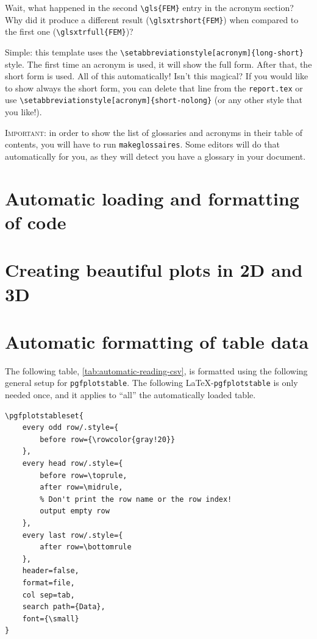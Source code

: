 Wait, what happened in the second \verb|\gls{FEM}| entry in the acronym section? Why did it produce a different result (\verb|\glsxtrshort{FEM}|) when compared to the first one (\verb|\glsxtrfull{FEM}|)?

Simple: this template uses the \verb|\setabbreviationstyle[acronym]{long-short}| style. The first time an acronym is used, it will show the full form. After that, the short form is used. All of this automatically! Isn't this magical? If you would like to show always the short form, you can delete that line from the \texttt{report.tex} or use \verb|\setabbreviationstyle[acronym]{short-nolong}| (or any other style that you like!).

\textsc{\color{red}Important:} in order to show the list of glossaries and acronyms in their table of contents, you will have to run \verb|makeglossaires|. Some editors will do that automatically for you, as they will detect you have a glossary in your document.

\section{Automatic loading and formatting of code}

\section{Creating beautiful plots in 2D and 3D}

\section{Automatic formatting of table data} \label{sec:pgfplotstable}

The following table, \cref{tab:automatic-reading-csv}, is formatted using the following general setup for \verb|pgfplotstable|. The following \LaTeX-\verb|pgfplotstable| is only needed once, and it applies to ``all'' the automatically loaded table.

\begin{lstlisting}[language={[LaTeX]TeX}]
% Configure the general setting of pgfplotstable
\pgfplotstableset{
	every odd row/.style={
		before row={\rowcolor{gray!20}}
	},
	every head row/.style={
		before row=\toprule,
		after row=\midrule,
		% Don't print the row name or the row index!
		output empty row
	},
	every last row/.style={
		after row=\bottomrule
	},
	header=false,
	format=file,
	col sep=tab,
	search path={Data},
	font={\small}
}
\end{lstlisting}

